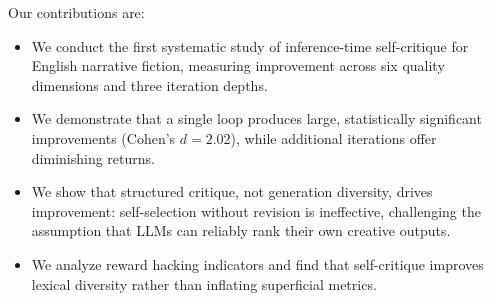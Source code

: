 Our contributions are:
\begin{itemize}[leftmargin=*,itemsep=0pt,topsep=0pt]
    \item We conduct the first systematic study of inference-time self-critique for English narrative fiction, measuring improvement across six quality dimensions and three iteration depths.
    \item We demonstrate that a single \critiquerevise loop produces large, statistically significant improvements (Cohen's $d = 2.02$), while additional iterations offer diminishing returns.
    \item We show that structured critique, not generation diversity, drives improvement: \bestofn self-selection without revision is ineffective, challenging the assumption that LLMs can reliably rank their own creative outputs.
    \item We analyze reward hacking indicators and find that self-critique improves lexical diversity rather than inflating superficial metrics.
\end{itemize}
